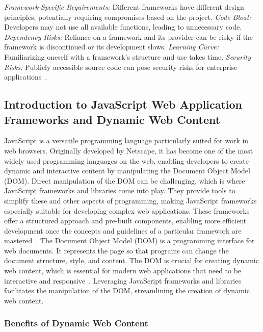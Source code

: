 \documentclass[conference]{IEEEtran}
\begin{document}
\textit{Framework-Specific Requirements:} Different frameworks have different design principles, potentially requiring compromises based on the project.
\newline\textit{Code Bloat:} Developers may not use all available functions, leading to unnecessary code.
\newline\textit{Dependency Risks:} Reliance on a framework and its provider can be risky if the framework is discontinued or its development slows.
\newline\textit{Learning Curve:} Familiarizing oneself with a framework’s structure and use takes time.
\newline\textit{Security Risks:} Publicly accessible source code can pose security risks for enterprise applications~\cite{ionos_webframeworks}.
\newline
\subsection{Introduction to JavaScript Web Application Frameworks and Dynamic Web Content}

JavaScript is a versatile programming language particularly suited for work in web browsers. Originally developed by Netscape, it has become one of the most widely used programming languages on the web, enabling developers to create dynamic and interactive content by manipulating the Document Object Model (DOM). Direct manipulation of the DOM can be challenging, which is where JavaScript frameworks and libraries come into play. They provide tools to simplify these and other aspects of programming, making JavaScript frameworks especially suitable for developing complex web applications. These frameworks offer a structured approach and pre-built components, enabling more efficient development once the concepts and guidelines of a particular framework are mastered~\cite{ionos_jsframeworks}.
\newline
The Document Object Model (DOM) is a programming interface for web documents. It represents the page so that programs can change the document structure, style, and content. The DOM is crucial for creating dynamic web content, which is essential for modern web applications that need to be interactive and responsive~\cite{mdn_dom}. Leveraging JavaScript frameworks and libraries facilitates the manipulation of the DOM, streamlining the creation of dynamic web content.
\newline
\subsubsection{Benefits of Dynamic Web Content}
\end{document}
